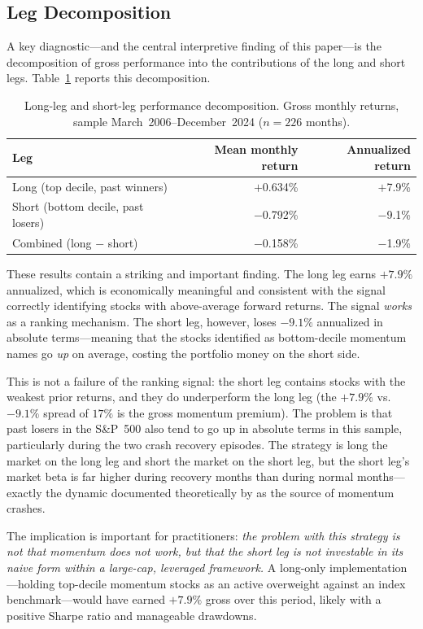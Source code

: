\documentclass[11pt]{article}
\begin{document}
\subsection{Leg Decomposition}

A key diagnostic---and the central interpretive finding of this paper---is the
decomposition of gross performance into the contributions of the long and short legs.
Table~\ref{tab:legs} reports this decomposition.

\begin{table}[!ht]
\centering
\caption{Long-leg and short-leg performance decomposition. Gross monthly returns,
         sample March~2006--December~2024 ($n = 226$ months).}
\label{tab:legs}
\begin{tabular}{lrr}
\toprule
Leg & Mean monthly return & Annualized return \\
\midrule
Long (top decile, past winners)  & $+$0.634\% & $+$7.9\% \\
Short (bottom decile, past losers) & $-$0.792\% & $-$9.1\% \\
\midrule
Combined (long $-$ short) & $-$0.158\% & $-$1.9\% \\
\bottomrule
\end{tabular}
\end{table}

\noindent
These results contain a striking and important finding. The long leg earns $+7.9\%$
annualized, which is economically meaningful and consistent with the signal correctly
identifying stocks with above-average forward returns. The signal \emph{works} as a
ranking mechanism. The short leg, however, loses $-9.1\%$ annualized in absolute
terms---meaning that the stocks identified as bottom-decile momentum names go \emph{up}
on average, costing the portfolio money on the short side.

This is not a failure of the ranking signal: the short leg contains stocks with the
weakest prior returns, and they do underperform the long leg (the $+7.9\%$ vs.\ $-9.1\%$
spread of $17\%$ is the gross momentum premium). The problem is that past losers in the
S\&P~500 also tend to go up in absolute terms in this sample, particularly during the
two crash recovery episodes. The strategy is long the market on the long leg and short
the market on the short leg, but the short leg's market beta is far higher during
recovery months than during normal months---exactly the dynamic documented theoretically
by \citet{Daniel2016} as the source of momentum crashes.

The implication is important for practitioners: \emph{the problem with this strategy is
not that momentum does not work, but that the short leg is not investable in its naive
form within a large-cap, leveraged framework.} A long-only implementation---holding top-decile
momentum stocks as an active overweight against an index benchmark---would have earned
$+7.9\%$ gross over this period, likely with a positive Sharpe ratio and manageable drawdowns.
\end{document}
